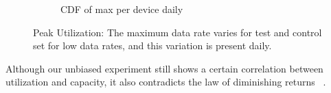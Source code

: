 \begin{figure}[ht!]
\begin{minipage}{0.90\linewidth}
\begin{subfigure}[b]{0.90\linewidth}
  \caption{CDF of max per device daily}
  \vspace{1em}
  \label{fig:CDF-data-rate-max-daily}
\end{subfigure}
\end{minipage}
\caption{Peak Utilization: The maximum data rate varies for test and control set for low data rates, and this variation is present daily.}
\label{fig:peak-utilization}
\end{figure}

Although our unbiased experiment still
shows a certain correlation between utilization and capacity, it also contradicts the
law of diminishing returns ~\cite{bischof2014broadband-behavior}. 